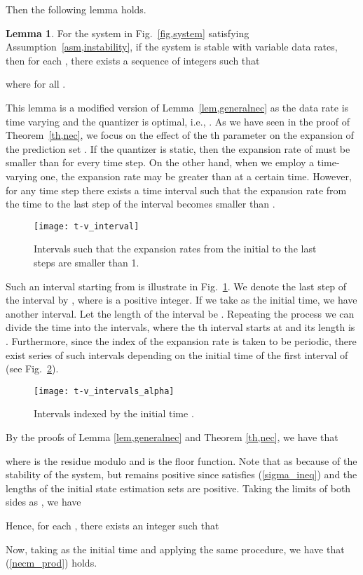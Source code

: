 \documentclass[a4paper, 11pt]{article}
\makeatletter
\theoremstyle{definition}
\newtheorem{lem}{Lemma}
\newenvironment{pf}[1][\proofname]{\par\pushQED{\qed}
 \normalfont\topsep6\p@\@plus6\p@\relax\trivlist\item[\hskip\labelsep\bfseries#1\@addpunct{.}]
 \ignorespaces}{\popQED\endtrivlist\@endpefalse}
\newcommand{\fref}[1]{Fig.~\ref{#1}}
\makeatother
\begin{document}
Then the following lemma holds.
\begin{lem}\label{lem,necm_pre}
 For the system in \fref{fig,system} satisfying Assumption~\ref{asm,instability},
if the system is stable with variable data rates,
then for each , there exists a sequence of integers
 such that

where  for all .
\end{lem}

This lemma is a modified version of Lemma~\ref{lem,generalnec} as the
data rate is time varying and the quantizer is optimal, i.e., .
As we have seen in the proof of Theorem~\ref{th,nec}, we focus on the effect
of the th parameter  on the expansion of the prediction set .
If the quantizer is static, then the expansion rate
 of  must be smaller than  for every time step.
On the other hand, when we employ a time-varying one, the expansion rate
may be greater than  at a certain time.
However, for any time step there exists a time interval such that
the expansion rate from the time to the last step of the interval
becomes smaller than .
\begin{figure}[t]
 \centering
 \texttt{[image: t-v\_interval]}
 \caption{Intervals such that the expansion rates from the initial
 to the last steps are smaller than 1.}
 \label{fig,t-v_interval}
\end{figure}
Such an interval starting from  is illustrate in \fref{fig,t-v_interval}.
We denote the last step of the interval by , where  is a
positive integer.
If we take  as the initial time, we have another interval.
Let the length of the interval be .
Repeating the process we can divide the time into the intervals, where
the th interval starts at  and
its length is .
Furthermore, since the index of the expansion rate  is taken to be
 periodic, there exist  series of such intervals depending on the initial
time  of the first interval of 
(see \fref{fig,t-v_intervals_alpha}).

\begin{figure}[t]
 \centering
 \texttt{[image: t-v\_intervals\_alpha]}
 \caption{Intervals indexed by the initial time .}
 \label{fig,t-v_intervals_alpha}
\end{figure}

\begin{pf}[Proof of Lemma~\ref{lem,necm_pre}]
By the proofs of Lemma \ref{lem,generalnec} and Theorem \ref{th,nec}, we have that

where  is the residue modulo  and 
is the floor function.
Note that  as  because of the stability of the system,
but  remains positive since  satisfies (\ref{sigma_ineq})
and the lengths of the initial state estimation sets are positive.
Taking the limits of both sides as , we have 

Hence, for each , there exists an integer
 such that


Now, taking  as the initial time and applying the same procedure,
we have that (\ref{necm_prod}) holds.
\end{pf}
\end{document}
